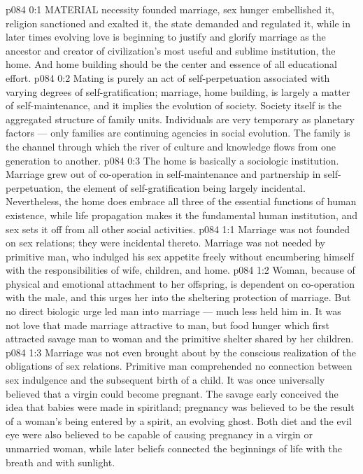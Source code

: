\vs p084 0:1 MATERIAL necessity founded marriage, sex hunger embellished it, religion sanctioned and exalted it, the state demanded and regulated it, while in later times evolving love is beginning to justify and glorify marriage as the ancestor and creator of civilization’s most useful and sublime institution, the home. And home building should be the center and essence of all educational effort.
\vs p084 0:2 Mating is purely an act of self\hyp{}perpetuation associated with varying degrees of self\hyp{}gratification; marriage, home building, is largely a matter of self\hyp{}maintenance, and it implies the evolution of society. Society itself is the aggregated structure of family units. Individuals are very temporary as planetary factors --- only families are continuing agencies in social evolution. The family is the channel through which the river of culture and knowledge flows from one generation to another.
\vs p084 0:3 The home is basically a sociologic institution. Marriage grew out of co\hyp{}operation in self\hyp{}maintenance and partnership in self\hyp{}perpetuation, the element of self\hyp{}gratification being largely incidental. Nevertheless, the home does embrace all three of the essential functions of human existence, while life propagation makes it the fundamental human institution, and sex sets it off from all other social activities.
\vs p084 1:1 Marriage was not founded on sex relations; they were incidental thereto. Marriage was not needed by primitive man, who indulged his sex appetite freely without encumbering himself with the responsibilities of wife, children, and home.
\vs p084 1:2 Woman, because of physical and emotional attachment to her offspring, is dependent on co\hyp{}operation with the male, and this urges her into the sheltering protection of marriage. But no direct biologic urge led man into marriage --- much less held him in. It was not love that made marriage attractive to man, but food hunger which first attracted savage man to woman and the primitive shelter shared by her children.
\vs p084 1:3 \pc Marriage was not even brought about by the conscious realization of the obligations of sex relations. Primitive man comprehended no connection between sex indulgence and the subsequent birth of a child. It was once universally believed that a virgin could become pregnant. The savage early conceived the idea that babies were made in spiritland; pregnancy was believed to be the result of a woman’s being entered by a spirit, an evolving ghost. Both diet and the evil eye were also believed to be capable of causing pregnancy in a virgin or unmarried woman, while later beliefs connected the beginnings of life with the breath and with sunlight.
